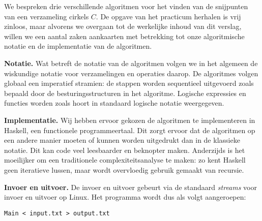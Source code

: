 We bespreken drie verschillende algoritmen voor het vinden van de
snijpunten van een verzameling cirkels $C$. De opgave van het
practicum herhalen is vrij zinloos, maar alvorens we overgaan tot de
werkelijke inhoud van dit verslag, willen we een aantal zaken
aankaarten met betrekking tot onze algoritmische notatie en de
implementatie van de algoritmen.

\textbf{Notatie.} Wat betreft de notatie van de algoritmen volgen we in het algemeen de
wiskundige notatie voor verzamelingen en operaties daarop. De
algoritmes volgen globaal een imperatief stramien: de stappen worden
sequentieel uitgevoerd zoals bepaald door de besturingsstructuren in
het algoritme. Logische expressies en functies worden zoals hoort in
standaard logische notatie weergegeven.

\textbf{Implementatie.} Wij hebben ervoor gekozen de algoritmen te
implementeren in Haskell, een functionele programmeertaal. Dit zorgt
ervoor dat de algoritmen op een andere manier moeten of kunnen worden
uitgedrukt dan in de klassieke notatie. Dit kan code veel leesbaarder
en beknopter maken. Anderzijds is het moeilijker om een traditionele
complexiteitsanalyse te maken: zo kent Haskell geen iteratieve lussen,
maar wordt overvloedig gebruik gemaakt van recursie.

\textbf{Invoer en uitvoer.} De invoer en uitvoer gebeurt via de
standaard \textit{streams} voor invoer en uitvoer op Linux. Het
programma wordt dus als volgt aangeroepen:
\begin{verbatim}
Main < input.txt > output.txt
\end{verbatim}
